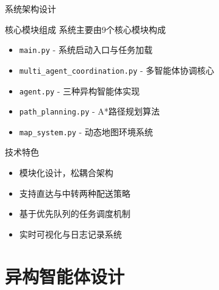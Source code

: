 \documentclass[
10pt,
aspectratio=169,
]{beamer}
\begin{document}
\begin{frame}{系统架构设计}
    \begin{block}{核心模块组成}
        系统主要由9个核心模块构成%
        \begin{itemize}
            \item \texttt{main.py} - 系统启动入口与任务加载
            \item \texttt{multi\_agent\_coordination.py} - 多智能体协调核心
            \item \texttt{agent.py} - 三种异构智能体实现
            \item \texttt{path\_planning.py} - A*路径规划算法
            \item \texttt{map\_system.py} - 动态地图环境系统
        \end{itemize}
    \end{block}
    
    \begin{alertblock}{技术特色}
        \begin{itemize}
            \item 模块化设计，松耦合架构
            \item 支持直达与中转两种配送策略
            \item 基于优先队列的任务调度机制
            \item 实时可视化与日志记录系统
        \end{itemize}
    \end{alertblock}
\end{frame}


\section{异构智能体设计}
\end{document}
